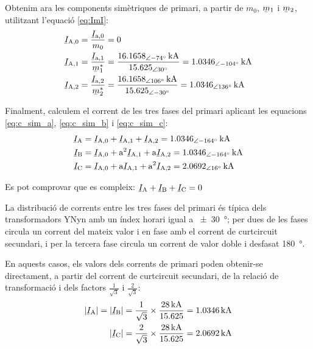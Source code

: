 \begin{exemple}[\CCasimSecTrafo{}]
    Obtenim ara les components simètriques de primari, a partir de $m_0$, $\cmplx{m}_1$ i $\cmplx{m}_2$, utilitzant l'equació \eqref{eq:ImI}:
    \begin{align*}
        \cmplx{I}\ped{A,0} &= \frac{\cmplx{I}\ped{a,0}}{m_0} = 0 \\
        \cmplx{I}\ped{A,1} &= \frac{\cmplx{I}\ped{a,1}}{\cmplx{m}^*_1} = \frac{\qtypd{16,1658}{-74}{kA}}{\numpd{15,625}{30}} =  \qtypd{1,0346}{-104}{kA} \\
        \cmplx{I}\ped{A,2} &= \frac{\cmplx{I}\ped{a,2}}{\cmplx{m}^*_2} = \frac{\qtypd{16,1658}{106}{kA}}{\numpd{15,625}{-30}} = \qtypd{1,0346}{136}{kA}
    \end{align*}

    Finalment, calculem el corrent de les tres fases del primari aplicant les equacions \eqref{eq:c_sim_a}, \eqref{eq:c_sim_b} i \eqref{eq:c_sim_c}:
     \begin{align*}
        \cmplx{I}\ped{A} &= \cmplx{I}\ped{A,0} + \cmplx{I}\ped{A,1} + \cmplx{I}\ped{A,2} = \qtypd{1,0346}{-164}{kA} \\
        \cmplx{I}\ped{B} &= \cmplx{I}\ped{A,0} + \au^2 \cmplx{I}\ped{A,1} + \au \cmplx{I}\ped{A,2} = \qtypd{1,0346}{-164}{kA} \\
        \cmplx{I}\ped{C} &= \cmplx{I}\ped{A,0} + \au \cmplx{I}\ped{A,1} + \au^2 \cmplx{I}\ped{A,2} = \qtypd{2,0692}{16}{kA}
    \end{align*}

    Es pot comprovar que es compleix: $\cmplx{I}\ped{A} + \cmplx{I}\ped{B} + \cmplx{I}\ped{C} = 0$

    La distribució de corrents entre les tres fases del primari és típica dels transformadors YNyn amb un índex horari igual a \qty{+-30}{\degree}; per dues de les fases circula un corrent del mateix valor  i en fase amb el corrent de curtcircuit secundari, i per la tercera fase circula un corrent de valor doble i desfasat \qty{180}{\degree}.

     En aquests casos, els valors dels corrents de primari poden obtenir-se directament, a partir del corrent de curtcircuit secundari, de la relació de transformació i dels factors $\frac{1}{\sqrt{3}}$ i  $\frac{2}{\sqrt{3}}$:
    \begin{align*}
        |\cmplx{I}\ped{A}| = |\cmplx{I}\ped{B}| = \frac{1}{\sqrt{3}} \times \frac{\qty{28}{kA}}{\num{15,625}} = \qty{1,0346}{kA} \\
        |\cmplx{I}\ped{C}|= \frac{2}{\sqrt{3}} \times \frac{\qty{28}{kA}}{\num{15,625}} = \qty{2,0692}{kA}
    \end{align*}

\end{exemple}




